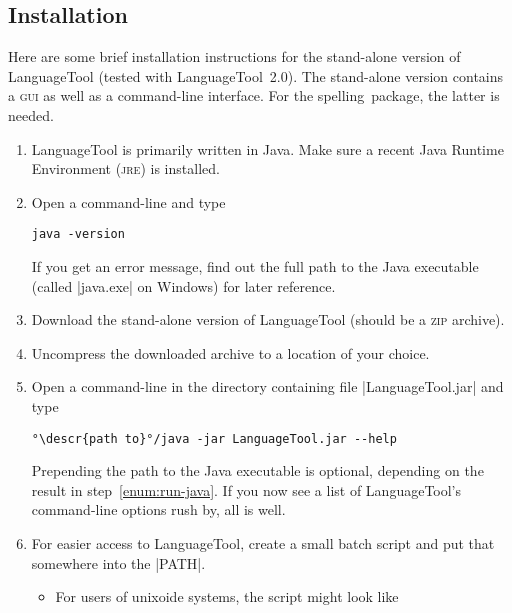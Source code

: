 \documentclass[11pt]{article}
\newcommand*{\pkg}{\textsf{spelling}}
\newcommand*{\acr}[1]{\mbox{\scshape#1}}
\newcommand*{\descr}[1]{〈\emph{#1}〉}
\begin{document}
\subsection{Installation}
\label{sec:lt-installation}

Here are some brief installation instructions for the stand-alone
version of LanguageTool (tested with LanguageTool~2.0).  The stand-alone
version contains a \acr{gui} as well as a command-line interface.  For
the \pkg\ package, the latter is needed.

\begin{enumerate}

\item LanguageTool is primarily written in Java.  Make sure a recent
  Java Runtime Environment (\acr{jre}) is installed.

\item\label{enum:run-java} Open a command-line and type

\begin{lstlisting}
java -version
\end{lstlisting}
%
  If you get an error message, find out the full path to the Java
  executable (called |java.exe| on Windows) for later reference.

\item Download the stand-alone version of LanguageTool (should be a
  \acr{zip} archive).

\item Uncompress the downloaded archive to a location of your choice.

\item Open a command-line in the directory containing file
  |LanguageTool.jar| and type

\begin{lstlisting}[escapeinside=°°]
°\descr{path to}°/java -jar LanguageTool.jar --help
\end{lstlisting}
%
  Prepending the path to the Java executable is optional, depending on
  the result in step~\ref{enum:run-java}.  If you now see a list of
  LanguageTool's command-line options rush by, all is well.

\item For easier access to LanguageTool, create a small batch script and
  put that somewhere into the |PATH|.

  \begin{itemize}

  \item For users of unixoide systems, the script might look like


\end{itemize}
\end{enumerate}
\end{document}
